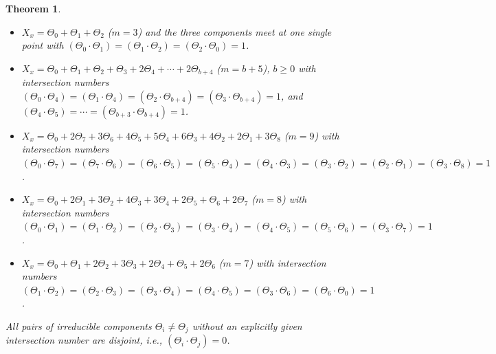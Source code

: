 \documentclass{report}
\DeclareMathOperator{\I}{I}
\DeclareMathOperator{\II}{II}
\DeclareMathOperator{\III}{III}
\DeclareMathOperator{\IV}{IV}
\newtheorem{theorem}[equation]{Theorem}
\theoremstyle{definition}
\begin{document}
\begin{theorem}
\begin{itemize}
\item[$\IV$:] $X_x=\Theta_0+\Theta_1+\Theta_2$ ($m=3$) and the three components meet at one single point with $(\Theta_0\cdot\Theta_1)=(\Theta_1\cdot\Theta_2)=(\Theta_2\cdot\Theta_0)=1$.

\item[$\I_b^*$:] $X_x=\Theta_0+\Theta_1+\Theta_2+\Theta_3+2\Theta_4+\cdots+2\Theta_{b+4}$ ($m=b+5$), $b\geq0$ with intersection numbers $(\Theta_0\cdot\Theta_4)=(\Theta_1\cdot\Theta_4)=(\Theta_2\cdot\Theta_{b+4})=(\Theta_3\cdot\Theta_{b+4})=1$, and $(\Theta_4\cdot\Theta_5)=\cdots=(\Theta_{b+3}\cdot\Theta_{b+4})=1$.

\item[$\II^*$:] $X_x=\Theta_0+2\Theta_7+3\Theta_6+4\Theta_5+5\Theta_4+6\Theta_3+4\Theta_2+2\Theta_1+3\Theta_8$ ($m=9$) with intersection numbers $(\Theta_0\cdot\Theta_7)=(\Theta_7\cdot\Theta_6)=(\Theta_6\cdot\Theta_5)=(\Theta_5\cdot\Theta_4)=(\Theta_4\cdot\Theta_3)=(\Theta_3\cdot\Theta_2)=(\Theta_2\cdot\Theta_1)=(\Theta_3\cdot\Theta_8)=1$.

\item[$\III^*$:] $X_x=\Theta_0+2\Theta_1+3\Theta_2+4\Theta_3+3\Theta_4+2\Theta_5+\Theta_6+2\Theta_7$ ($m=8$) with intersection numbers $(\Theta_0\cdot\Theta_1)=(\Theta_1\cdot\Theta_2)=(\Theta_2\cdot\Theta_3)=(\Theta_3\cdot\Theta_4)=(\Theta_4\cdot\Theta_5)=(\Theta_5\cdot\Theta_6)=(\Theta_3\cdot\Theta_7)=1$.

\item[$\IV^*$:] $X_x=\Theta_0+\Theta_1+2\Theta_2+3\Theta_3+2\Theta_4+\Theta_5+2\Theta_6$ ($m=7$) with intersection numbers $(\Theta_1\cdot\Theta_2)=(\Theta_2\cdot\Theta_3)=(\Theta_3\cdot\Theta_4)=(\Theta_4\cdot\Theta_5)=(\Theta_3\cdot\Theta_6)=(\Theta_6\cdot\Theta_0)=1$.
\end{itemize}

All pairs of irreducible components $\Theta_i\neq\Theta_j$ without an explicitly given intersection number are disjoint, i.e., $(\Theta_i\cdot\Theta_j)=0$.
\end{theorem}
\end{document}
